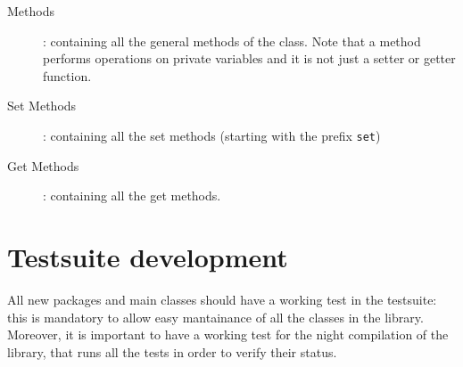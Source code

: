 \documentclass[a4paper]{article}
\begin{document}
\begin{enumerate}
\begin{description}
      \item[Methods]: containing all the general methods of the class. Note that a method performs operations on private variables and it is not just a setter or getter function.
      \item[Set Methods]: containing all the set methods (starting with the prefix \texttt{set})
      \item[Get Methods]: containing all the get methods.
  \end{description}
\end{enumerate}

\section{Testsuite development} \label{testsuite}
All new packages and main classes should have a working test in the testsuite: this is mandatory to allow easy mantainance of all the classes in the library. Moreover, it is important to have a working test for the night compilation of the library, that runs all the tests in order to verify their status.
\end{document}
